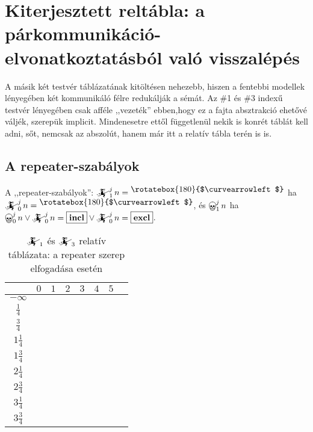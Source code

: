 \documentclass{article}
\newcommand{\blk}{\cellcolor{darkgray}}
\newcommand{\red}{\cellcolor{red!33}}
\newcommand{\grn}{\cellcolor{green!33}}
\newcommand{\nothing}{\text{\raisebox{0.4em}{\rotatebox{180}{$\curvearrowleft$}}}}%
\newcommand{\just}[1]{\boxed{#1}}%
\newcommand{\incl}{\mathbf{incl}}
\newcommand{\excl}{\mathbf{excl}}
\newcommand{\mainfun}[3]{\mathwitch_{#1}^{#2}#3}
\newcommand{\nomainfun}[3]{\bigskull_{#1}^{#2}#3}
\newcommand{\currymainfun}[1]{\mathwitch_{#1}}
\begin{document}
	\section{Kiterjesztett reltábla: a párkommunikáció-elvonatkoztatásból való visszalépés}

	A másik két testvér táblázatának kitöltésen nehezebb, hiszen a fentebbi modellek lényegében két kommunikáló félre redukálják a sémát.
	Az \#1 és \#3 indexű testvér lényegében csak afféle ,,vezeték'' ebben,hogy ez a fajta absztrakció ehetővé váljék, szerepük implicit.
	Mindenesetre ettől függetlenül nekik is konrét táblát kell adni, sőt, nemcsak az abszolút, hanem már itt a relatív tábla terén is is.

	\subsection{A repeater-szabályok} 

	A ,,repeater-szabályok'': $\mainfun1jn = \nothing$ ha $\mainfun0jn = \nothing$, és $\nomainfun1jn$ ha $\nomainfun0jn \lor \mainfun0jn = \just\incl \lor \mainfun0jn = \just\excl$.

	\begin{table}[H]
		\caption*{$\currymainfun1$ és $\currymainfun3$ relatív táblázata: a repeater szerep elfogadása esetén}
		\centering
		\begin{tabular}{c||c|c|c|c|c|c|c|}
				&	$0$		&	$1$		&	$2$		&	$3$		&	$4$		&	$5$		\\\hline\hline
		$-\infty$	&	\nothing	&	\nothing	&	\nothing	&	\nothing	&	\nothing	&	\nothing	\\\hline
		$\frac14$	&	\nothing	&	\nothing	&	\nothing	&	\nothing	&	\nothing	&	\grn\just\incl	\\\hline
		$\frac34$	&	\red\just\excl	&	\nothing	&	\nothing	&	\nothing	&	\nothing	&	\grn\just\incl	\\\hline
		$1\frac14$	&	\red\just\excl	&	\nothing	&	\nothing	&	\nothing	&	\grn\just\incl	&	\blk		\\\hline
		$1\frac34$	&	\blk		&	\red\just\excl	&	\nothing	&	\nothing	&	\grn\just\incl	&	\blk		\\\hline
		$2\frac14$	&	\blk		&	\red\just\excl	&	\nothing	&	\grn\just\incl	&	\blk		&	\blk		\\\hline
		$2\frac34$	&	\blk		&	\blk		&	\red\just\excl	&	\grn\just\incl	&	\blk		&	\blk		\\\hline
		$3\frac14$	&	\blk		&	\blk		&	\blk		&	\blk		&	\blk		&	\blk		\\\hline
		$3\frac34$	&	\blk		&	\blk		&	\blk		&	\blk		&	\blk		&	\blk		\\\hline
		\end{tabular}
	\end{table}
\end{document}
